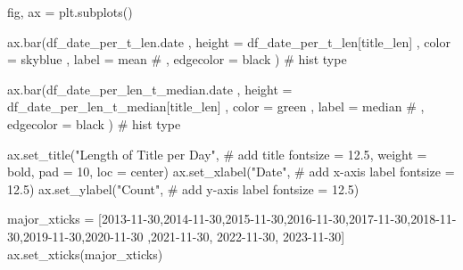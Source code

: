 \documentclass[
  letterpaper,
  DIV=11,
  numbers=noendperiod]{scrartcl}
\newenvironment{Shaded}{\begin{snugshade}}{\end{snugshade}}
\newcommand{\CommentTok}[1]{\textcolor[rgb]{0.37,0.37,0.37}{#1}}
\newcommand{\DecValTok}[1]{\textcolor[rgb]{0.68,0.00,0.00}{#1}}
\newcommand{\FloatTok}[1]{\textcolor[rgb]{0.68,0.00,0.00}{#1}}
\newcommand{\NormalTok}[1]{\textcolor[rgb]{0.00,0.23,0.31}{#1}}
\newcommand{\OperatorTok}[1]{\textcolor[rgb]{0.37,0.37,0.37}{#1}}
\newcommand{\StringTok}[1]{\textcolor[rgb]{0.13,0.47,0.30}{#1}}
\begin{document}
\begin{Shaded}
\begin{Highlighting}[]
\NormalTok{fig, ax }\OperatorTok{=}\NormalTok{ plt.subplots()}

\NormalTok{ax.bar(df\_date\_per\_t\_len.date}
\NormalTok{    ,  height }\OperatorTok{=}\NormalTok{ df\_date\_per\_t\_len[}\StringTok{\textquotesingle{}title\_len\textquotesingle{}}\NormalTok{]}
\NormalTok{    ,  color }\OperatorTok{=} \StringTok{\textquotesingle{}skyblue\textquotesingle{}}
\NormalTok{    ,  label }\OperatorTok{=} \StringTok{\textquotesingle{}mean\textquotesingle{}}
    \CommentTok{\# ,  edgecolor = \textquotesingle{}black\textquotesingle{}}
\NormalTok{      ) }\CommentTok{\# hist type}


\NormalTok{ax.bar(df\_date\_per\_len\_t\_median.date}
\NormalTok{    ,  height }\OperatorTok{=}\NormalTok{ df\_date\_per\_len\_t\_median[}\StringTok{\textquotesingle{}title\_len\textquotesingle{}}\NormalTok{]}
\NormalTok{    ,  color }\OperatorTok{=} \StringTok{\textquotesingle{}green\textquotesingle{}}
\NormalTok{    ,  label }\OperatorTok{=} \StringTok{\textquotesingle{}median\textquotesingle{}}
    \CommentTok{\# ,  edgecolor = \textquotesingle{}black\textquotesingle{}}
\NormalTok{      ) }\CommentTok{\# hist type}


\NormalTok{ax.set\_title(}\StringTok{"Length of Title per Day"}\NormalTok{, }\CommentTok{\# add title}
\NormalTok{             fontsize }\OperatorTok{=} \FloatTok{12.5}\NormalTok{,}
\NormalTok{             weight }\OperatorTok{=} \StringTok{\textquotesingle{}bold\textquotesingle{}}\NormalTok{,}
\NormalTok{             pad }\OperatorTok{=} \DecValTok{10}\NormalTok{,}
\NormalTok{             loc }\OperatorTok{=} \StringTok{\textquotesingle{}center\textquotesingle{}}\NormalTok{)}
\NormalTok{ax.set\_xlabel(}\StringTok{"Date"}\NormalTok{, }\CommentTok{\# add x{-}axis label}
\NormalTok{              fontsize }\OperatorTok{=} \FloatTok{12.5}\NormalTok{)}
\NormalTok{ax.set\_ylabel(}\StringTok{"Count"}\NormalTok{, }\CommentTok{\# add y{-}axis label}
\NormalTok{              fontsize }\OperatorTok{=} \FloatTok{12.5}\NormalTok{)}

\NormalTok{major\_xticks }\OperatorTok{=}\NormalTok{ [}\StringTok{\textquotesingle{}2013{-}11{-}30\textquotesingle{}}\NormalTok{,}\StringTok{\textquotesingle{}2014{-}11{-}30\textquotesingle{}}\NormalTok{,}\StringTok{\textquotesingle{}2015{-}11{-}30\textquotesingle{}}\NormalTok{,}\StringTok{\textquotesingle{}2016{-}11{-}30\textquotesingle{}}\NormalTok{,}\StringTok{\textquotesingle{}2017{-}11{-}30\textquotesingle{}}\NormalTok{,}\StringTok{\textquotesingle{}2018{-}11{-}30\textquotesingle{}}\NormalTok{,}\StringTok{\textquotesingle{}2019{-}11{-}30\textquotesingle{}}\NormalTok{,}\StringTok{\textquotesingle{}2020{-}11{-}30\textquotesingle{}}
\NormalTok{                ,}\StringTok{\textquotesingle{}2021{-}11{-}30\textquotesingle{}}\NormalTok{, }\StringTok{\textquotesingle{}2022{-}11{-}30\textquotesingle{}}\NormalTok{, }\StringTok{\textquotesingle{}2023{-}11{-}30\textquotesingle{}}\NormalTok{]}
\NormalTok{ax.set\_xticks(major\_xticks)}


\end{Highlighting}
\end{Shaded}
\end{document}
